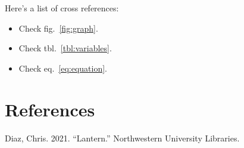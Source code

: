 \documentclass{book}
\providecommand{\tightlist}{%
  \setlength{\itemsep}{0pt}\setlength{\parskip}{0pt}}
\newlength{\cslhangindent}
\newlength{\cslentryspacingunit} %
\newenvironment{CSLReferences}[2] %
 {%
  \setlength{\parindent}{0pt}
  \ifodd #1
  \let\oldpar\par
  \def\par{\hangindent=\cslhangindent\oldpar}
  \fi
  \setlength{\parskip}{#2\cslentryspacingunit}
 }%
 {}
\begin{document}
Here's a list of cross references:

\begin{itemize}
\tightlist
\item
  Check fig.~\ref{fig:graph}.
\item
  Check tbl.~\ref{tbl:variables}.
\item
  Check eq.~\ref{eq:equation}.
\end{itemize}

\hypertarget{bibliography}{%
\chapter*{References}\label{bibliography}}

\hypertarget{refs}{}
\begin{CSLReferences}{1}{0}
\leavevmode{}%
Diaz, Chris. 2021. {``Lantern.''} Northwestern University Libraries.

\end{CSLReferences}

\backmatter
\end{document}
